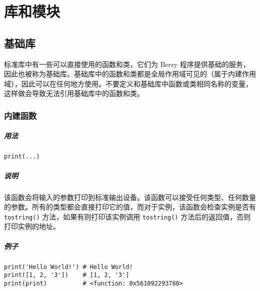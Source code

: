 \chapter{库和模块}

\section{基础库}

标准库中有一些可以直接使用的函数和类，它们为 Berry 程序提供基础的服务，因此也被称为基础库。基础库中的函数和类都是全局作用域可见的（属于内建作用域），因此可以在任何地方使用。不要定义和基础库中函数或类相同名称的变量，这样做会导致无法引用基础库中的函数和类。

\subsection{内建函数}


\paragraph{用法}
\begin{lstlisting}[language=berry, numbers=none]
print(...)
\end{lstlisting}

\paragraph{说明}
该函数会将输入的参数打印到标准输出设备。该函数可以接受任何类型、任何数量的参数。所有的类型都会直接打印它的值，而对于实例，该函数会检查实例是否有 \texttt{tostring()} 方法，如果有则打印该实例调用 \texttt{tostring()} 方法后的返回值，否则打印实例的地址。

\paragraph{例子}
\begin{lstlisting}[language=berry, numbers=none]
print('Hello World!') # Hello World!
print([1, 2, '3'])    # [1, 2, '3']
print(print)          # <function: 0x561092293780>
\end{lstlisting}


